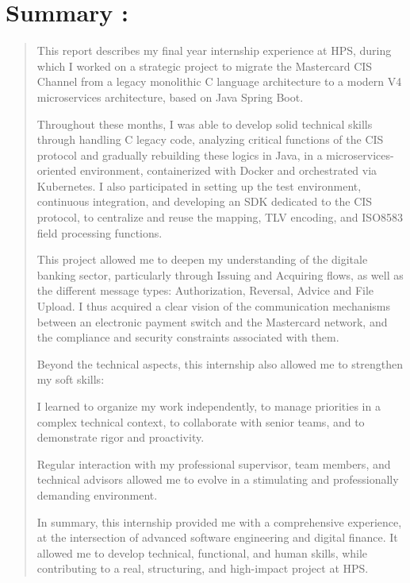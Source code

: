 \documentclass[12pt,a4paper]{report}
\begin{document}
\section{Summary :}

\begin{quote}
This report describes my final year internship experience at HPS, during
which I worked on a strategic project to migrate the Mastercard CIS
Channel from a legacy monolithic C language architecture to a modern V4
microservices architecture, based on Java Spring Boot.

Throughout these months, I was able to develop solid technical skills
through handling C legacy code, analyzing critical functions of the CIS
protocol and gradually rebuilding these logics in Java, in a
microservices-oriented environment, containerized with Docker and
orchestrated via Kubernetes. I also participated in setting up the test
environment, continuous integration, and developing an SDK dedicated to
the CIS protocol, to centralize and reuse the mapping, TLV encoding, and
ISO8583 field processing functions.

This project allowed me to deepen my understanding of the digitale
banking sector, particularly through Issuing and Acquiring flows, as
well as the different message types: Authorization, Reversal, Advice and
File Upload. I thus acquired a clear vision of the communication
mechanisms between an electronic payment switch and the Mastercard
network, and the compliance and security constraints associated with
them.

Beyond the technical aspects, this internship also allowed me to
strengthen my soft skills:

I learned to organize my work independently, to manage priorities in a
complex technical context, to collaborate with senior teams, and to
demonstrate rigor and proactivity.

Regular interaction with my professional supervisor, team members, and
technical advisors allowed me to evolve in a stimulating and
professionally demanding environment.

In summary, this internship provided me with a comprehensive experience,
at the intersection of advanced software engineering and digital
finance. It allowed me to develop technical, functional, and human
skills, while contributing to a real, structuring, and high-impact
project at HPS.
\end{quote}
\clearpage
\end{document}
